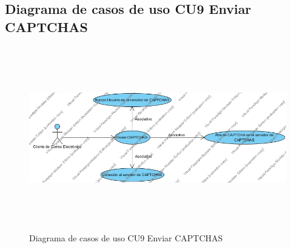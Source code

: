 \pagebreak
\subsection{Diagrama de casos de uso CU9 Enviar CAPTCHAS}
\begin{figure}[H]
	\includegraphics[width=1\linewidth, height=8cm]{./images/casodeuso9.jpg}
	\caption{Diagrama de casos de uso CU9 Enviar CAPTCHAS}
	\label{fig:4-10-1}
\end{figure}


